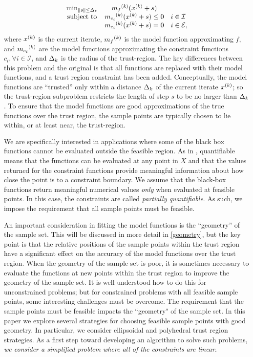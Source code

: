 \[ \begin{array}{ccl} \min_{\| s \| \le \Delta_k}
 & {{m}_f}^{(k)} ({x^{(k)}}+s) \\
\mbox{subject to} & {{m}_{c_i}}^{(k)}({x^{(k)}} + s) \le 0 & i \in \mathcal{I} \\
& {{m}_{c_i}}^{(k)}({x^{(k)}} + s) = 0 & i \in \mathcal{E},
\end{array}
\]
where ${x^{(k)}}$ is the current iterate, ${{m}_f}^{(k)}$ is the model function approximating $f$,  and ${{m}_{c_i}}^{(k)}$ are the model functions approximating the constraint functions $c_i, \forall i \in \mathcal{I} $, and $\Delta_k$ is the radius of the trust-region.
The key differences between this problem and the original is that all functions are replaced with their model functions, and a trust region constraint has been added.
Conceptually, the model functions are ``trusted'' only within a distance $\Delta_k$ of the current iterate ${x^{(k)}}$; so the trust-region subproblem restricts the length of step $s$ to be no larger than $\Delta_k$.
To ensure that the model functions are good approximations of the true functions over the trust region, the sample points are typically chosen to lie within, or at least near, the trust-region.


We are specifically interested in applications where some of the black box functions cannot be evaluated outside the feasible region.
As in \cite{DUMMY:typesofconstraints}, quantifiable means that the functions can be evaluated at any point in $X$ and that the values returned for the constraint functions provide meaningful information about how close the point is to a constraint boundary.
We assume that the black-box functions return meaningful numerical values \emph{only} when evaluated at feasible points.
In this case, the constraints are called {\em partially quantifiable}.   
As such, we impose the requirement that all sample points must be feasible.

An important consideration in fitting the model functions is the ``geometry'' of the sample set.
This will be discussed in more detail in \cref{geometry}, but the key point is that the relative positions of the sample points within the trust region have a significant effect on the accuracy of the model functions over the trust region.
When the geometry of the sample set is poor, it is sometimes necessary to evaluate the functions at new points within the trust region to improve the geometry of the sample set.
It is well understood how to do this for unconstrained problems; but for constrained problems with all feasible sample points, some interesting challenges must be overcome.
The requirement that the sample points must be feasible impacts the ``geometry" of the sample set.
In this paper we explore several strategies for choosing feasible sample points with good geometry.
In particular, we consider ellipsoidal and polyhedral trust region strategies.
As a first step toward developing an algorithm to solve such problems, \emph{we consider a simplified problem where all of the constraints are linear}.

